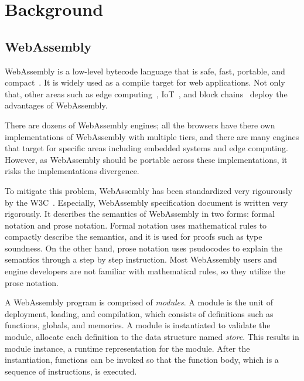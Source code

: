 
\chapter{Background}
\label{ch:background}
\noindent


\section{WebAssembly}


WebAssembly is a low-level bytecode language that is safe, fast, portable, and
compact~\cite{wasm}.
It is widely used as a compile target for web applications.
Not only that, other areas such as edge computing~\cite{wasm-edge},
IoT~\cite{wasm-iot}, and block chains~\cite{wasm-block} deploy the advantages
of WebAssembly.


There are dozens of WebAssembly engines; all the browsers have there own
implementations of WebAssembly with multiple tiers, and there are many engines
that target for specific areas including embedded systems and edge computing.
However, as WebAssembly should be portable across these implementations, it risks
the implementations divergence.


To mitigate this problem, WebAssembly has been standardized very rigourously by
the W3C~\cite{wasm-w3c}.
Especially, WebAssembly specification document is written very rigorously.
It describes the semantics of WebAssembly in two forms: formal notation and
prose notation.
Formal notation uses mathematical rules to compactly describe the semantics,
and it is used for proofs such as type soundness.
On the other hand, prose notation uses psudocodes to explain the semantics
through a step by step instruction.
Most WebAssembly users and engine developers are not familiar with
mathematical rules, so they utilize the prose notation.


A WebAssembly program is comprised of \textit{modules}.
A module is the unit of deployment, loading, and compilation, which consists of
definitions such as functions, globals, and memories.
A module is instantiated to validate the module, allocate each definition to
the data structure named \textit{store}.
This results in module instance, a runtime representation for the module.
After the instantiation, functions can be invoked so that the function body,
which is a sequence of instructions, is executed.


